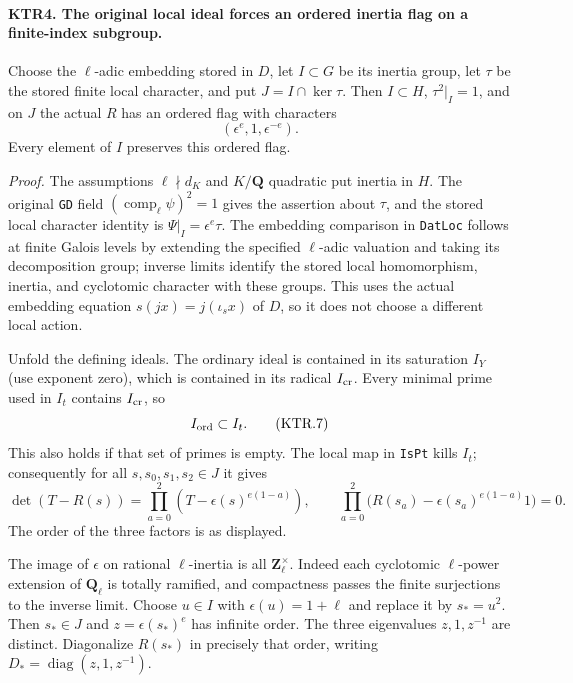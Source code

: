 \paragraph{KTR4. The original local ideal forces an ordered inertia flag on a finite-index subgroup.}
\label{claim:KTR4}
Choose the \(\ell\)-adic embedding stored in \(D\), let
\(I\subset G\) be its inertia group, let \(\tau\) be the
stored finite local character, and put \(J=I\cap\ker\tau\).
Then \(I\subset H\), \(\tau^2|_I=1\), and on \(J\)
the actual \(R\) has an ordered flag with characters
\[
                      (\epsilon^e,1,\epsilon^{-e}).
 \tag{KTR.6}
\]
Every element of \(I\) preserves this ordered flag.

\emph{Proof.}
The assumptions \(\ell\nmid d_K\) and \(K/\mathbf Q\)
quadratic put inertia in \(H\).  The original \texttt{GD}
field \((\operatorname{comp}_\ell\psi)^2=1\) gives the
assertion about \(\tau\), and the stored local character
identity is \(\Psi|_I=\epsilon^e\tau\).
The embedding comparison in \texttt{DatLoc} follows at finite
Galois levels by extending the specified \(\ell\)-adic
valuation and taking its decomposition group; inverse limits
identify the stored local homomorphism, inertia, and cyclotomic
character with these groups.  This uses the actual embedding
equation \(s(jx)=j(\iota_s x)\) of \(D\), so it does not
choose a different local action.

Unfold the defining ideals.  The ordinary ideal is contained in
its saturation \(I_Y\) (use exponent zero), which is contained
in its radical \(I_{\rm cr}\).  Every minimal prime used in
\(I_t\) contains \(I_{\rm cr}\), so
\[
                    I_{\rm ord}\subset I_t.
 \tag{KTR.7}
\]
This also holds if that set of primes is empty.  The local map
in \texttt{IsPt} kills \(I_t\); consequently for all
\(s,s_0,s_1,s_2\in J\) it gives
\[
 \det(T-R(s))=\prod_{a=0}^2(T-\epsilon(s)^{e(1-a)}),
 \qquad
 \prod_{a=0}^2\bigl(R(s_a)-\epsilon(s_a)^{e(1-a)}1\bigr)=0.
 \tag{KTR.8}
\]
The order of the three factors is as displayed.

The image of \(\epsilon\) on rational \(\ell\)-inertia is
all \(\mathbf Z_\ell^\times\).  Indeed each cyclotomic
\(\ell\)-power extension of \(\mathbf Q_\ell\) is totally
ramified, and compactness passes the finite surjections to the
inverse limit.  Choose \(u\in I\) with
\(\epsilon(u)=1+\ell\) and replace it by \(s_*=u^2\).
Then \(s_*\in J\) and \(z=\epsilon(s_*)^e\) has infinite
order.  The three eigenvalues \(z,1,z^{-1}\) are distinct.
Diagonalize \(R(s_*)\) in precisely that order, writing
\(D_* =\operatorname{diag}(z,1,z^{-1})\).

